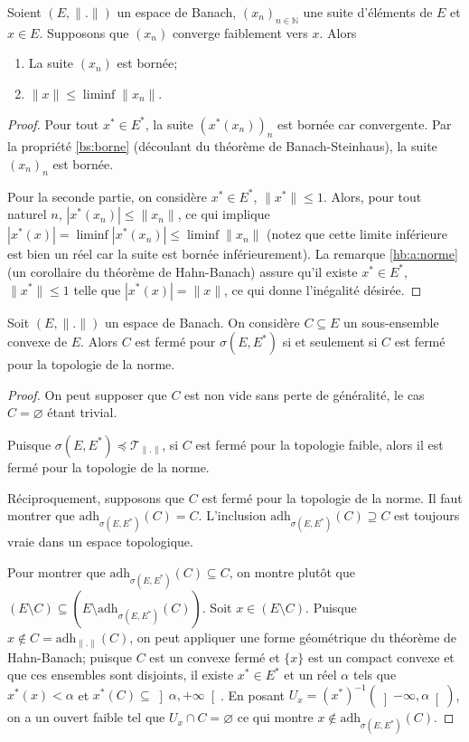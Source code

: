 \begin{prop}
  Soient $(E, \|.\|)$ un espace de Banach, $(x_n)_{n\in\mathbb N}$ une suite
  d'éléments de $E$ et $x\in E$. Supposons que $(x_n)$ converge faiblement
  vers $x$.
  Alors
  \begin{enumerate}
  \item La suite $(x_n)$ est bornée;
  \item $\|x\|\leq\liminf\|x_n\|$.
  \end{enumerate}
\end{prop}
\begin{proof}
  Pour tout $x^*\in E^*$, la suite $(x^*(x_n))_n$ est bornée car convergente.
  Par la propriété \ref{bs:borne} (découlant du théorème de Banach-Steinhaus),
  la suite $(x_n)_n$ est bornée.

  Pour la seconde partie, on considère $x^*\in E^*$, $\|x^*\|\leq 1$.
  Alors, pour tout naturel $n$, $|x^*(x_n)|\leq \|x_n\|$, ce qui
  implique $|x^*(x)| = \liminf|x^*(x_n)| \leq \liminf \|x_n\|$ (notez que
  cette limite inférieure est bien un réel car la suite est
  bornée inférieurement).
  La remarque \ref{hb:a:norme} (un corollaire du théorème de Hahn-Banach)
  assure qu'il existe $x^*\in E^*$, $\|x^*\|\leq 1$ telle que
  $|x^*(x)| = \|x\|$, ce qui donne l'inégalité désirée.
\end{proof}

\begin{prop}\label{faib:conv}
  Soit $(E, \|.\|)$ un espace de Banach. On considère $C\subseteq E$
  un sous-ensemble convexe de $E$. Alors
  $C$ est fermé pour $\sigma(E, E^*)$ si et seulement si $C$ est fermé
  pour la topologie de la norme.
\end{prop}
\begin{proof}
  On peut supposer que $C$ est non vide sans perte de généralité, le cas
  $C = \varnothing$ étant trivial.

  Puisque $\sigma(E, E^*)\preceq \mathcal T_{\|.\|}$, si $C$ est fermé
  pour la topologie faible, alors il est fermé pour la topologie de la norme.

  Réciproquement, supposons que $C$ est fermé pour la topologie de la
  norme. Il faut montrer que $\mathrm{adh}_{\sigma(E, E^*)}(C) = C$.
  L'inclusion $\mathrm{adh}_{\sigma(E, E^*)}(C) \supseteq C$ est toujours vraie
  dans un espace topologique.

  Pour montrer que $\mathrm{adh}_{\sigma(E, E^*)}(C)\subseteq C$, on
  montre plutôt que $(E\setminus C) \subseteq (E\setminus
  \mathrm{adh}_{\sigma(E, E^*)}(C))$. Soit $x\in (E\setminus C)$. Puisque
  $x\notin C = \mathrm{adh}_{\|.\|}(C)$, on peut appliquer une forme géométrique
  du théorème de Hahn-Banach; puisque $C$ est un convexe fermé et $\{x\}$
  est un compact convexe et que ces ensembles sont disjoints,
  il existe $x^*\in E^*$ et un réel $\alpha$
  tels que $x^*(x)< \alpha$ et $x^*(C)\subseteq \left]\alpha, +\infty\right[$.
  En posant $U_x = (x^*)^{-1}(\left]-\infty, \alpha\right[)$, on a un ouvert
  faible tel que $U_x\cap C = \varnothing$ ce qui montre
  $x\notin \mathrm{adh}_{\sigma(E, E^*)}(C)$.
\end{proof}

